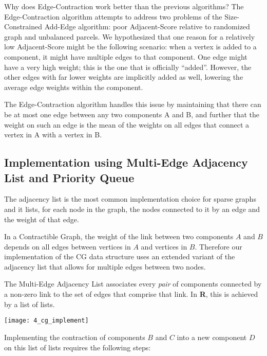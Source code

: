 Why does Edge-Contraction work better than the previous algorithms?
The Edge-Contraction algorithm attempts to address two problems of
the Size-Constrained Add-Edge algorithm: poor Adjacent-Score relative
to randomized graph and unbalanced parcels. We hypothesized that one
reason for a relatively low Adjacent-Score might be the following
scenario: when a vertex is added to a component, it might have multiple
edges to that component. One edge might have a very high weight; this is
the one that is officially ``added''. However, the other edges with far
lower weights are implicitly added as well, lowering the average edge
weights within the component.

The Edge-Contraction algorithm handles this issue by maintaining that
there can be at most one edge between any two components A and B, and
further that the weight on such an edge is the mean of the weights on
all edges that connect a vertex in A with a vertex in B.

\subsection{Implementation using Multi-Edge Adjacency List and
Priority Queue}

The adjacency list is the most common implementation choice for sparse
graphs and it lists, for each node in the graph, the nodes connected to
it by an edge and the weight of that edge.

In a Contractible Graph, the weight of the link between two components
$A$ and $B$ depends on all edges between vertices in $A$ and vertices in
$B$. Therefore our implementation of the CG data structure uses an
extended variant of the adjacency list that allows for multiple edges
between two nodes.

The Multi-Edge Adjacency List associates every \textit{pair} of
components connected by a non-zero link to the set of edges that
comprise that link. In \textbf{R}, this is achieved by a list of lists.

\texttt{[image: 4\_cg\_implement]}

Implementing the contraction of components $B$ and $C$ into a new
component $D$ on this list of lists requires the following steps:

